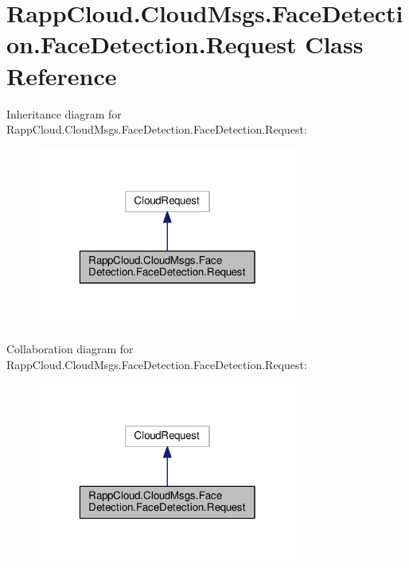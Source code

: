 \hypertarget{classRappCloud_1_1CloudMsgs_1_1FaceDetection_1_1FaceDetection_1_1Request}{\section{Rapp\-Cloud.\-Cloud\-Msgs.\-Face\-Detection.\-Face\-Detection.\-Request Class Reference}
\label{classRappCloud_1_1CloudMsgs_1_1FaceDetection_1_1FaceDetection_1_1Request}
}


Inheritance diagram for Rapp\-Cloud.\-Cloud\-Msgs.\-Face\-Detection.\-Face\-Detection.\-Request\-:
\nopagebreak
\begin{figure}[H]
\begin{center}
\leavevmode
\includegraphics[width=244pt]{classRappCloud_1_1CloudMsgs_1_1FaceDetection_1_1FaceDetection_1_1Request__inherit__graph}
\end{center}
\end{figure}


Collaboration diagram for Rapp\-Cloud.\-Cloud\-Msgs.\-Face\-Detection.\-Face\-Detection.\-Request\-:
\nopagebreak
\begin{figure}[H]
\begin{center}
\leavevmode
\includegraphics[width=244pt]{classRappCloud_1_1CloudMsgs_1_1FaceDetection_1_1FaceDetection_1_1Request__coll__graph}
\end{center}
\end{figure}
